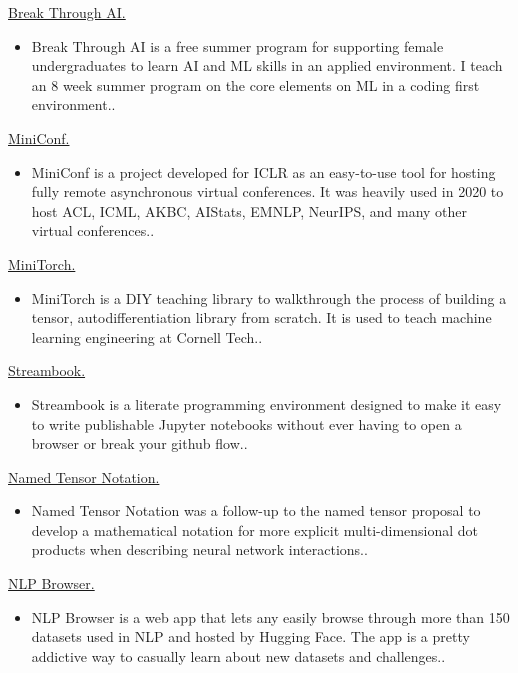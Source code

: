 \documentclass[10pt]{article}
\begin{document}
\ind \href{ paper.link } { Break Through AI. }
\begin{itemize}
\item Break Through AI is a free summer program for supporting female undergraduates to learn AI and ML skills in an applied environment. I teach an 8 week summer program on the core elements on ML in a coding first environment..
\end{itemize}
\medskip


\ind \href{ paper.link } { MiniConf. }
\begin{itemize}
\item MiniConf is a project developed for ICLR as an easy-to-use tool for hosting fully remote asynchronous virtual conferences. It was heavily used in 2020 to host ACL, ICML, AKBC, AIStats, EMNLP, NeurIPS, and many other virtual conferences..
\end{itemize}
\medskip


\ind \href{ paper.link } { MiniTorch. }
\begin{itemize}
\item MiniTorch is a DIY teaching library to walkthrough the process of building a tensor, autodifferentiation library from scratch. It is used to teach machine learning engineering at Cornell Tech..
\end{itemize}
\medskip


\ind \href{ paper.link } { Streambook. }
\begin{itemize}
\item Streambook is a literate programming environment designed to make it easy to write publishable Jupyter notebooks without ever having to open a browser or break your github flow..
\end{itemize}
\medskip


\ind \href{ paper.link } { Named Tensor Notation. }
\begin{itemize}
\item Named Tensor Notation was a follow-up to the named tensor proposal to develop a mathematical notation for more explicit multi-dimensional dot products when describing neural network interactions..
\end{itemize}
\medskip


\ind \href{ paper.link } { NLP Browser. }
\begin{itemize}
\item NLP Browser is a web app that lets any easily browse through more than 150 datasets used in NLP and hosted by Hugging Face. The app is a pretty addictive way to casually learn about new datasets and challenges..
\end{itemize}
\medskip
\end{document}

